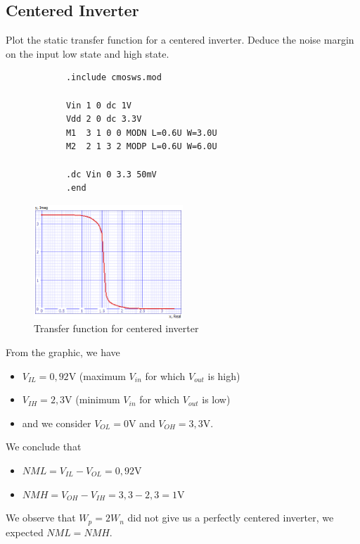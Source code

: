 \documentclass[../main.tex]{subfiles}
\begin{document}
	\subsection{Centered Inverter}
	{
		\begin{tcolorbox}[colback=gray!5!white,colframe=gray!75!black]
			Plot the static transfer function for a centered inverter. Deduce the noise margin on the input low state and high state.
		\end{tcolorbox}
	
		\begin{lstlisting}
			.include cmosws.mod
			
			Vin 1 0 dc 1V
			Vdd 2 0 dc 3.3V
			M1  3 1 0 0 MODN L=0.6U W=3.0U
			M2  2 1 3 2 MODP L=0.6U W=6.0U
			
			.dc Vin 0 3.3 50mV
			.end
		\end{lstlisting}
		
		\begin{figure}[H]
			\centering
			\includegraphics[width=0.5\textwidth]{plots/Q3.png}
			\caption{Transfer function for centered inverter}
		\end{figure}
		
		From the graphic, we have
		\begin{itemize}
			\item $V_{IL} = 0,92$V (maximum $V_{in}$ for which $V_{out}$ is high)
			\item $V_{IH} = 2,3$V (minimum $V_{in}$ for which $V_{out}$ is low)
			\item and we consider $V_{OL} = 0$V and $V_{OH} = 3,3$V.
		\end{itemize}
		
		We conclude that
		\begin{itemize}
			\item $NML = V_{IL} - V_{OL} = 0,92$V
			\item $NMH = V_{OH} - V_{IH} = 3,3 - 2,3 = 1$V
		\end{itemize}
		
		We observe that $W_p = 2W_n$ did not give us a perfectly centered inverter, we expected $NML = NMH$.
	}
\end{document}
